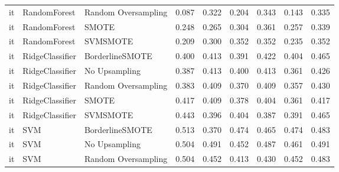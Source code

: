 \begin{tabular}{lllllllll}
      it &                 RandomForest & Random Oversampling &     0.087 &                     0.322 &                 0.204 &                  0.343 &                                   0.143 &     0.335 \\
      it &                 RandomForest &               SMOTE &     0.248 &                     0.265 &                 0.304 &                  0.361 &                                   0.257 &     0.339 \\
      it &                 RandomForest &            SVMSMOTE &     0.209 &                     0.300 &                 0.352 &                  0.352 &                                   0.235 &     0.352 \\
      it &              RidgeClassifier &     BorderlineSMOTE &     0.400 &                     0.413 &                 0.391 &                  0.422 &                                   0.404 &     0.465 \\
      it &              RidgeClassifier &       No Upsampling &     0.387 &                     0.413 &                 0.400 &                  0.413 &                                   0.361 &     0.426 \\
      it &              RidgeClassifier & Random Oversampling &     0.383 &                     0.409 &                 0.370 &                  0.409 &                                   0.357 &     0.430 \\
      it &              RidgeClassifier &               SMOTE &     0.417 &                     0.409 &                 0.378 &                  0.404 &                                   0.361 &     0.417 \\
      it &              RidgeClassifier &            SVMSMOTE &     0.443 &                     0.396 &                 0.404 &                  0.387 &                                   0.391 &     0.465 \\
      it &                          SVM &     BorderlineSMOTE &     0.513 &                     0.370 &                 0.474 &                  0.465 &                                   0.474 &     0.483 \\
      it &                          SVM &       No Upsampling &     0.504 &                     0.491 &                 0.452 &                  0.487 &                                   0.461 &     0.491 \\
      it &                          SVM & Random Oversampling &     0.504 &                     0.452 &                 0.413 &                  0.430 &                                   0.452 &     0.483 \\

\end{tabular}
